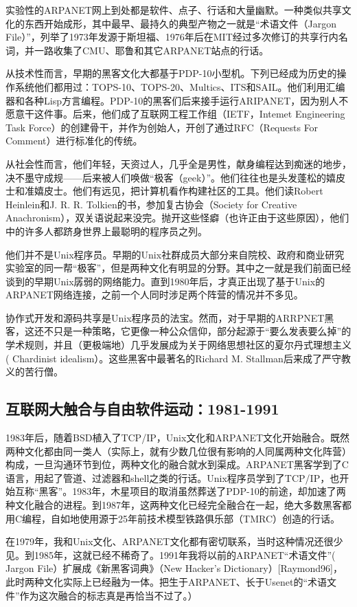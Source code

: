 \documentclass[11pt,oneside]{book}
\begin{document}
\begin{common-format}
实验性的ARPANET网上到处都是软件、点子、行话和大量幽默。一种类似共享文化的东西开始成形，其中最早、最持久的典型产物之一就是“术语文件（Jargon File）”，列举了1973年发源于斯坦福、1976年后在MIT经过多次修订的共享行内名词，并一路收集了CMU、耶鲁和其它ARPANET站点的行话。

从技术性而言，早期的黑客文化大都基于PDP-10小型机。下列已经成为历史的操作系统他们都用过：TOPS-10、TOPS-20、Multics、ITS和SAIL。他们利用汇编器和各种Lisp方言编程。PDP-10的黑客们后来接手运行ARIPANET，因为别人不愿意干这件事。后来，他们成了互联网工程工作组（IETF，Intemet Engineering Task Force）的创建骨干，并作为创始人，开创了通过RFC（Requests For Comment）进行标准化的传统。

从社会性而言，他们年轻，天资过人，几乎全是男性，献身编程达到痴迷的地步，决不墨守成规——后来被人们唤做“极客（geek）”。他们往往也是头发蓬松的嬉皮士和准嬉皮士。他们有远见，把计算机看作构建社区的工具。他们读Robert Heinlein和J. R. R. Tolkien的书，参加复古协会（Society for Creative Anachronism），双关语说起来没完。抛开这些怪癖（也许正由于这些原因），他们中的许多人都跻身世界上最聪明的程序员之列。

他们并不是Unix程序员。早期的Unix社群成员大部分来自院校、政府和商业研究实验室的同一帮“极客”，但是两种文化有明显的分野。其中之一就是我们前面已经谈到的早期Unix孱弱的网络能力。直到1980年后，才真正出现了基于Unix的ARPANET网络连接，之前一个人同时涉足两个阵营的情况并不多见。

协作式开发和源码共享是Unix程序员的法宝。然而，对于早期的ARRPNET黑客，这还不只是一种策略，它更像一种公众信仰，部分起源于“要么发表要么掉”的学术规则，并且（更极端地）几乎发展成为关于网络思想社区的夏尔丹式理想主义( Chardinist idealism）。这些黑客中最著名的Richard M. Stallman后来成了严守教义的苦行僧。

\subsection{互联网大触合与自由软件运动：1981-1991}
1983年后，随着BSD植入了TCP/IP，Unix文化和ARPANET文化开始融合。既然两种文化都由同一类人（实际上，就有少数几位很有影响的人同属两种文化阵营）构成，一旦沟通环节到位，两种文化的融合就水到渠成。ARPANET黑客学到了C语言，用起了管道、过滤器和shell之类的行话。Unix程序员学到了TCP/IP，也开始互称“黑客”。1983年，木星项目的取消虽然葬送了PDP-10的前途，却加速了两种文化融合的进程。到1987年，这两种文化已经完全融合在一起，绝大多数黑客都用C编程，自如地使用源于25年前技术模型铁路俱乐部（TMRC）创造的行话。

在1979年，我和Unix文化、ARPANET文化都有密切联系，当时这种情况还很少见。到1985年，这就已经不稀奇了。1991年我将以前的ARPANET“术语文件”( Jargon File）扩展成《新黑客词典》（New Hacker's Dictionary）[Raymond96]，此时两种文化实际上已经融为一体。把生于ARPANET、长于Usenet的“术语文件”作为这次融合的标志真是再恰当不过了。）


\end{common-format}
\end{document}
